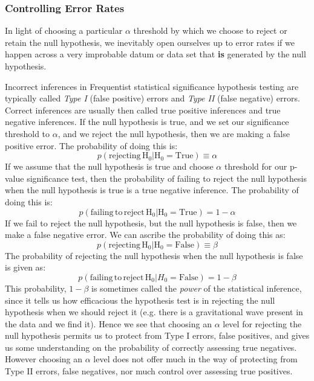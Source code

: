 \subsubsection{Controlling Error Rates}

In light of choosing a particular $\alpha$ threshold by which we choose to reject or retain the null hypothesis, we inevitably open ourselves up to error rates if we happen across a very improbable datum or data set that \textbf{is} generated by the null hypothesis.

Incorrect inferences in Frequentist statistical significance hypothesis testing are typically called \textit{Type I} (false positive) errors and \textit{Type II} (false negative) errors. Correct inferences are usually then called true positive inferences and true negative inferences. If the null hypothesis is true, and we set our significance threshold to $\alpha$, and we reject the null hypothesis, then we are making a false positive error. The probability of doing this is:
\begin{equation}
    p\left(\mathrm{rejecting \, H_{0}}| \mathrm{H_{0}} = \mathrm{True}\right) \equiv \alpha
\end{equation}
If we assume that the null hypothesis is true and choose $\alpha$ threshold for our p-value significance test, then the probability of failing to reject the null hypothesis when the null hypothesis is true is a true negative inference. The probability of doing this is:
\begin{equation}
    p\left(\mathrm{failing \, to \, reject \, H_{0}}| \mathrm{H_{0}} = \mathrm{True}\right) = 1 - \alpha
\end{equation}
 If we fail to reject the null hypothesis, but the null hypothesis is false, then we make a false negative error. We can ascribe the probability of doing this as:
 \begin{equation}
    p\left(\mathrm{rejecting \, H_{0}}| \mathrm{H_{0}} = \mathrm{False}\right) \equiv \beta
 \end{equation}
 The probability of rejecting the null hypothesis when the null hypothesis is false is given as:
 \begin{equation}
    p(\mathrm{failing \, to \, reject \, H_{0}}| H_{0} = \mathrm{False})= 1 - \beta    
 \end{equation}
 This probability, $1- \beta$ is sometimes called the \textit{power} of the statistical inference, since it tells us how efficacious the hypothesis test is in rejecting the null hypothesis when we should reject it (e.g. there is a gravitational wave present in the data and we find it). Hence we see that choosing an $\alpha$ level for rejecting the null hypothesis permits us to protect from Type I errors, false positives, and gives us some understanding on the probability of correctly assessing true negatives. However choosing an $\alpha$ level does not offer much in the way of protecting from Type II errors,  false negatives, nor much control over assessing true positives.


